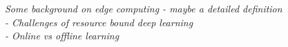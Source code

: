 \documentclass[../../D1.tex]{subfiles}
\begin{document}
\emph{Some background on edge computing - maybe a detailed definition\\
 - Challenges of resource bound deep learning\\
 - Online vs offline learning
 }
\end{document}

